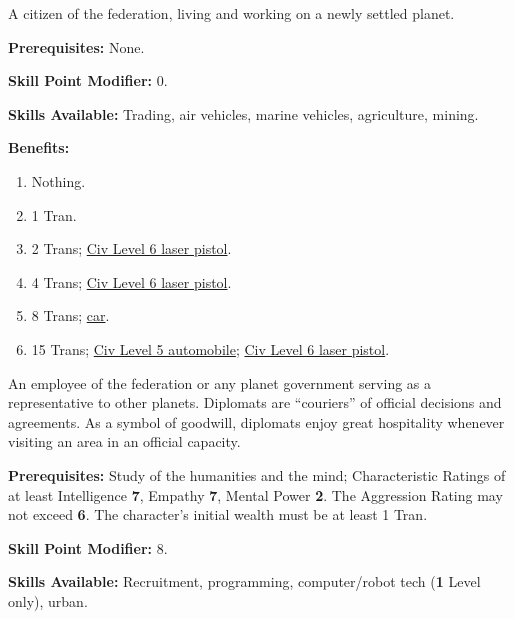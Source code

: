 A citizen of the federation, living and working on a newly settled
planet.

\textbf{Prerequisites:} None.

\textbf{Skill Point Modifier:} 0.

\textbf{Skills Available:}  Trading, air vehicles, marine vehicles,
agriculture, mining.

\pagebreak[2]
\textbf{Benefits:}
\begin{enumerate}
\item Nothing.
\item 1 Tran.
\item  2 Trans; \hyperlink{tag:cl6-laser}{Civ Level 6 laser pistol}.
\item  4 Trans; \hyperlink{tag:cl6-laser}{Civ Level 6 laser pistol}.
\item  8 Trans; \hyperlink{tag:auto}{car}.
\item  15 Trans; \hyperlink{tag:auto}{Civ Level 5 automobile}; \hyperlink{tag:cl6-laser}{Civ Level 6 laser pistol}.  
\end{enumerate}

\bigskip

\pagebreak[2]

\label{sec:prof-diplomat}

An employee of the federation or any planet government serving as a
representative to other planets. Diplomats are ``couriers'' of
official decisions and agreements. As a symbol of goodwill, diplomats
enjoy great hospitality whenever visiting an area in an official
capacity.

\textbf{Prerequisites:} Study of the humanities and the mind;
Characteristic Ratings of at least Intelligence \textbf{7}, Empathy \textbf{7}, Mental
Power \textbf{2}. The Aggression Rating may not exceed \textbf{6}. The character's
initial wealth must be at least 1 Tran.

\textbf{Skill Point Modifier:} 8.

\textbf{Skills Available:}  Recruitment, programming, computer/robot
   tech (\textbf{1} Level only), urban.

